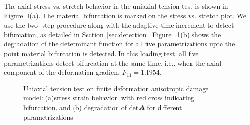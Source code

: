 \documentclass[12pt]{article}
\numberwithin{equation}{section}
\begin{document}
The axial stress vs. stretch behavior in the uniaxial tension test is 
shown in Figure~\ref{fig:aniso_stress_stretch}(a). The material 
bifurcation is marked on the stress vs. stretch plot. We use the two-
step procedure along with the adaptive time increment to detect 
bifurcation, as detailed in Section~\ref{sec:detection}. Figure~
\ref{fig:aniso_stress_stretch}(b) shows the degradation of the 
determinant function for all five parametrizations upto the point 
material bifurcation is detected. In this loading test, all five 
parametrizations detect bifurcation at the same time, i.e., when the 
axial component of the deformation gradient $F_11 = 1.1954$. 

\begin{figure}[H]
  \centering {} 
  \caption{Uniaxial tension test on finite deformation 
  anisotropic damage model: 
  (a)stress strain behavior, with red cross indicating bifurcation, and
  (b) degradation of det${\boldsymbol{A}}$ for different
  parametrizations.}
  \label{fig:aniso_stress_stretch}
\end{figure}
\end{document}
